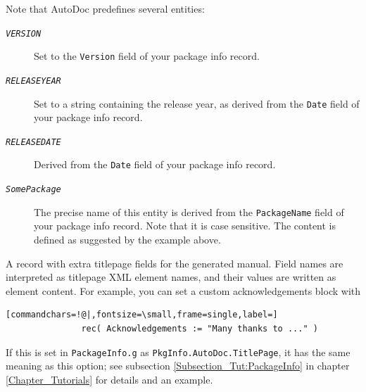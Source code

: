 \documentclass[a4paper,11pt]{report}
\begin{document}
{{{\begin{description}
\begin{description}
\begin{description}
 Note that \textsf{AutoDoc} predefines several entities: 
\begin{description}
\item[{\mbox{\texttt{\mdseries\slshape VERSION}}}] Set to the \texttt{Version} field of your package info record.
\item[{\mbox{\texttt{\mdseries\slshape RELEASEYEAR}}}] Set to a string containing the release year, as derived from the \texttt{Date} field of your package info record.
\item[{\mbox{\texttt{\mdseries\slshape RELEASEDATE}}}] Derived from the \texttt{Date} field of your package info record.
\item[{\mbox{\texttt{\mdseries\slshape SomePackage}}}]  The precise name of this entity is derived from the \texttt{PackageName} field of your package info record. Note that it is case sensitive. The content
is defined as suggested by the example above. 
\end{description}
 
\item[{\mbox{\texttt{\mdseries\slshape TitlePage}}}]  A record with extra title\texttt{}page fields for the generated
manual. Field names are interpreted as title\texttt{}page XML
element names, and their values are written as element content. For example,
you can set a custom acknowledgements block with 
\begin{Verbatim}[commandchars=!@|,fontsize=\small,frame=single,label=]
               rec( Acknowledgements := "Many thanks to ..." )
\end{Verbatim}
 If this is set in \texttt{PackageInfo.g} as \texttt{PkgInfo.AutoDoc.TitlePage}, it has the same meaning as this option; see subsection \ref{Subsection_Tut:PackageInfo} in chapter \ref{Chapter_Tutorials} for details and an example. 


\end{description}
\end{description}
\end{description}}}}
\end{document}
